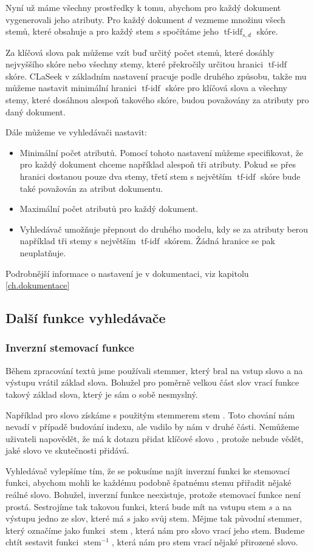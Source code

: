 \documentclass[12pt]{article}
\newcommand{\name}{CLaSeek}
\newcommand{\ssection}[1]{\subsection{#1}}
\newcommand{\sssection}[1]{\subsubsection{#1}}
\DeclareMathOperator{\tfidf}{tf-idf}
\DeclareMathOperator{\stem}{stem}
\newcommand{\invstem}{\stem^{-1}}
\begin{document}
Nyní už máme všechny prostředky k tomu, abychom pro každý dokument vygenerovali jeho atributy. Pro každý dokument $d$ vezmeme množinu všech stemů, které obsahuje a pro každý stem $s$ spočítáme jeho $\tfidf_{s,d}$ skóre. 

Za klíčová slova pak můžeme vzít buď určitý počet stemů, které dosáhly nejvyššího skóre nebo všechny stemy, které překročily určitou hranici $\tfidf$ skóre. \name{} v základním nastavení pracuje podle druhého způsobu, takže mu můžeme nastavit minimální hranici $\tfidf$ skóre pro klíčová slova a všechny stemy, které dosáhnou alespoň takového skóre, budou považovány za atributy pro daný dokument. 

Dále můžeme ve vyhledávači nastavit:

\begin{itemize}
	\item Minimální počet atributů. Pomocí tohoto nastavení můžeme specifikovat, že pro každý dokument chceme například alespoň tři atributy. Pokud se přes hranici dostanou pouze dva stemy, třetí stem s největším $\tfidf$ skóre bude také považován za atribut dokumentu. 
	\item Maximální počet atributů pro každý dokument. 
	\item Vyhledávač umožňuje přepnout do druhého modelu, kdy se za atributy berou například tři stemy s největším $\tfidf$ skórem. Žádná hranice se pak neuplatňuje. 
\end{itemize}

Podrobnější informace o nastavení je v dokumentaci, viz kapitolu \ref{ch.dokumentace}

\ssection{Další funkce vyhledávače}
\sssection{Inverzní stemovací funkce}

Během zpracování textů jsme používali stemmer, který bral na vstup slovo a na výstupu vrátil základ slova. Bohužel pro poměrně velkou část slov vrací funkce takový základ slova, který je sám o sobě nesmyslný. 

Například pro slovo  získáme s použitým stemmerem stem . Toto chování nám nevadí v případě budování indexu, ale vadilo by nám v druhé části. Nemůžeme uživateli napovědět, že má k dotazu přidat klíčové slovo , protože nebude vědět, jaké slovo ve skutečnosti přidává. 

Vyhledávač vylepšíme tím, že se pokusíme najít inverzní funkci ke stemovací funkci, abychom mohli ke každému podobně špatnému stemu přiřadit nějaké reálné slovo. Bohužel, inverzní funkce neexistuje, protože stemovací funkce není prostá. Sestrojíme tak takovou funkci, která bude mít na vstupu stem $s$ a na výstupu jedno ze slov, které má $s$ jako svůj stem. Mějme tak původní stemmer, který označíme jako funkci $\stem$, která nám pro slovo vrací jeho stem. Budeme chtít sestavit funkci $\invstem$, která nám pro stem vrací nějaké přirozené slovo.
\end{document}
